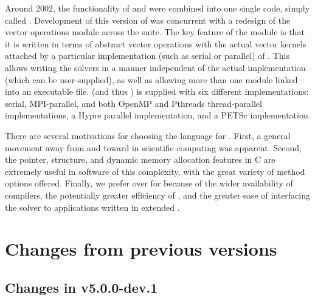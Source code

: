  Around 2002,
the functionality of {\cvode} and {\pvode} were combined into one
single code, simply called {\cvode}. Development of this version of
{\cvode} was concurrent with a redesign of the vector operations
module across the {\sundials} suite. The key feature of the
{\nvector} module is that it is written in terms of abstract vector
operations with the actual vector kernels attached by a particular
implementation (such as serial or parallel) of {\nvector}. This allows
writing the {\sundials} solvers in a manner independent of the actual
{\nvector} implementation (which can be user-supplied), as well as
allowing more than one {\nvector} module linked into an executable file.
{\sundials} (and thus {\cvode}) is supplied with six different {\nvector}
implementations:
serial, MPI-parallel, and both OpenMP and Pthreads thread-parallel
{\nvector} implementations, a Hypre parallel implementation,
and a PETSc implementation.

There are several motivations for choosing the {\CC} language for {\cvode}.
First, a general movement away from {\F} and toward {\CC} in scientific
computing was apparent.  Second, the pointer, structure, and dynamic
memory allocation features in C are extremely useful in software of
this complexity, with the great variety of method options offered.
Finally, we prefer {\CC} over {\CPP} for {\cvode} because of the wider
availability of {\CC} compilers, the potentially greater efficiency of {\CC},
and the greater ease of interfacing the solver to applications written
in extended {\F}.

\section{Changes from previous versions}

\subsection*{Changes in v5.0.0-dev.1}

